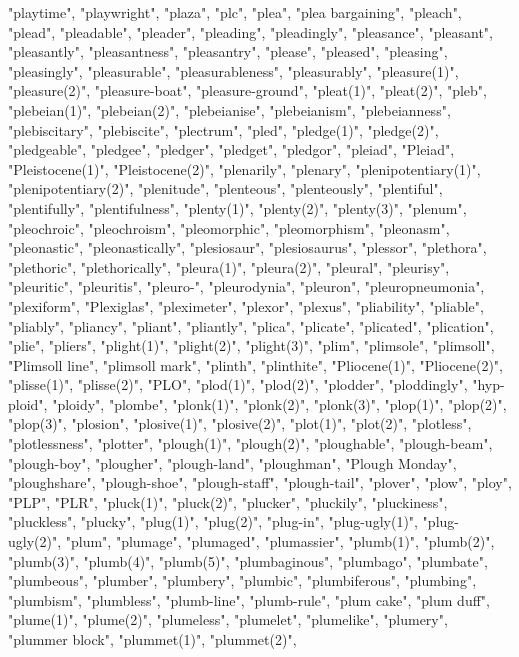 "playtime",
"playwright",
"plaza",
"plc",
"plea",
"plea bargaining",
"pleach",
"plead",
"pleadable",
"pleader",
"pleading",
"pleadingly",
"pleasance",
"pleasant",
"pleasantly",
"pleasantness",
"pleasantry",
"please",
"pleased",
"pleasing",
"pleasingly",
"pleasurable",
"pleasurableness",
"pleasurably",
"pleasure(1)",
"pleasure(2)",
"pleasure-boat",
"pleasure-ground",
"pleat(1)",
"pleat(2)",
"pleb",
"plebeian(1)",
"plebeian(2)",
"plebeianise",
"plebeianism",
"plebeianness",
"plebiscitary",
"plebiscite",
"plectrum",
"pled",
"pledge(1)",
"pledge(2)",
"pledgeable",
"pledgee",
"pledger",
"pledget",
"pledgor",
"pleiad",
"Pleiad",
"Pleistocene(1)",
"Pleistocene(2)",
"plenarily",
"plenary",
"plenipotentiary(1)",
"plenipotentiary(2)",
"plenitude",
"plenteous",
"plenteously",
"plentiful",
"plentifully",
"plentifulness",
"plenty(1)",
"plenty(2)",
"plenty(3)",
"plenum",
"pleochroic",
"pleochroism",
"pleomorphic",
"pleomorphism",
"pleonasm",
"pleonastic",
"pleonastically",
"plesiosaur",
"plesiosaurus",
"plessor",
"plethora",
"plethoric",
"plethorically",
"pleura(1)",
"pleura(2)",
"pleural",
"pleurisy",
"pleuritic",
"pleuritis",
"pleuro-",
"pleurodynia",
"pleuron",
"pleuropneumonia",
"plexiform",
"Plexiglas",
"pleximeter",
"plexor",
"plexus",
"pliability",
"pliable",
"pliably",
"pliancy",
"pliant",
"pliantly",
"plica",
"plicate",
"plicated",
"plication",
"plie",
"pliers",
"plight(1)",
"plight(2)",
"plight(3)",
"plim",
"plimsole",
"plimsoll",
"Plimsoll line",
"plimsoll mark",
"plinth",
"plinthite",
"Pliocene(1)",
"Pliocene(2)",
"plisse(1)",
"plisse(2)",
"PLO",
"plod(1)",
"plod(2)",
"plodder",
"ploddingly",
"hyp-ploid",
"ploidy",
"plombe",
"plonk(1)",
"plonk(2)",
"plonk(3)",
"plop(1)",
"plop(2)",
"plop(3)",
"plosion",
"plosive(1)",
"plosive(2)",
"plot(1)",
"plot(2)",
"plotless",
"plotlessness",
"plotter",
"plough(1)",
"plough(2)",
"ploughable",
"plough-beam",
"plough-boy",
"plougher",
"plough-land",
"ploughman",
"Plough Monday",
"ploughshare",
"plough-shoe",
"plough-staff",
"plough-tail",
"plover",
"plow",
"ploy",
"PLP",
"PLR",
"pluck(1)",
"pluck(2)",
"plucker",
"pluckily",
"pluckiness",
"pluckless",
"plucky",
"plug(1)",
"plug(2)",
"plug-in",
"plug-ugly(1)",
"plug-ugly(2)",
"plum",
"plumage",
"plumaged",
"plumassier",
"plumb(1)",
"plumb(2)",
"plumb(3)",
"plumb(4)",
"plumb(5)",
"plumbaginous",
"plumbago",
"plumbate",
"plumbeous",
"plumber",
"plumbery",
"plumbic",
"plumbiferous",
"plumbing",
"plumbism",
"plumbless",
"plumb-line",
"plumb-rule",
"plum cake",
"plum duff",
"plume(1)",
"plume(2)",
"plumeless",
"plumelet",
"plumelike",
"plumery",
"plummer block",
"plummet(1)",
"plummet(2)",
